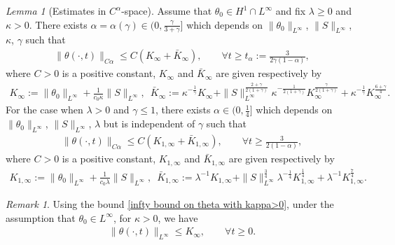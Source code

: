 \documentclass[reqno]{amsart}%
\theoremstyle{definition}
\theoremstyle{remark}
\numberwithin{equation}{section}
\newtheorem{lemma}[theorem]{Lemma}
\newtheorem{remark}[theorem]{Remark}
\newcommand{\bK}{\bar{K}_{\infty}}
\newcommand{\1}{\mathbf{1}}
\newcommand{\K}{K_{\infty}}
\numberwithin{equation}{section}
\numberwithin{theorem}{section}
\numberwithin{figure}{section}
\begin{document}
\begin{lemma}[Estimates in $C^\alpha$-space]\label{Estimates in C alpha-space lemma}
Assume that $\theta_0\in H^1\cap L^\infty$ and fix $\lambda\ge0$ and $\kappa>0$. There exists $\alpha=\alpha(\gamma)\in(0,\frac{\gamma}{3+\gamma}]$ which depends on $\|\theta_0\|_{L^\infty}$, $\|S\|_{L^\infty}$, $\kappa$, $\gamma$ such that
\begin{align}\label{bound on C alpha norm of theta with gamma}
\|\theta(\cdot,t)\|_{C\alpha}\le C(\K+\bK),\qquad\forall t\ge t_{\alpha}:=\frac{3}{2\gamma(1-\alpha)},
\end{align}
where $C>0$ is a positive constant, $\K$ and $\bK$ are given respectively by
{\footnotesize
\begin{align}\label{def of K and bar K}
\K:=\|\theta_0\|_{L^\infty}+\frac{1}{c_0\kappa}\|S\|_{L^\infty},\,\,\,\bK:=\kappa^{-\frac{1}{\gamma}}\K+\|S\|^\frac{2+\gamma}{2(1+\gamma)}_{L^\infty}\kappa^{-\frac{1}{2(1+\gamma)}}\K^{\frac{\gamma}{2(1+\gamma)}}+\kappa^{-\frac{1}{\gamma}}\K^{\frac{6+\gamma}{4}}.
\end{align}
}
For the case when $\lambda>0$ and $\gamma\le1$, there exists $\alpha\in(0,\frac{1}{4}]$ which depends on $\|\theta_0\|_{L^\infty}$, $\|S\|_{L^\infty}$, $\lambda$ but is independent of $\gamma$ such that 
\begin{align}\label{bound on C alpha norm of theta with gamma=1}
\|\theta(\cdot,t)\|_{C\alpha}\le C(K_{1,\infty}+\bar{K}_{1,\infty}),\qquad\forall t\ge \frac{3}{2(1-\alpha)},
\end{align}
where $C>0$ is a positive constant, $K_{1,\infty}$ and $\bar{K}_{1,\infty}$ are given respectively by
{\footnotesize
\begin{align}\label{def of K and bar K gamma=1}
K_{1,\infty}:=\|\theta_0\|_{L^\infty}+\frac{1}{c_0\lambda}\|S\|_{L^\infty},\,\,\,\bar{K}_{1,\infty}:=\lambda^{-1}K_{1,\infty}+\|S\|^\frac{3}{4}_{L^\infty}\lambda^{-\frac{1}{4}}K_{1,\infty}^{\frac{1}{4}}+\lambda^{-1}K_{1,\infty}^{\frac{7}{4}}.
\end{align}
}
\end{lemma}

\begin{remark}
Using the bound \eqref{infty bound on theta with kappa>0}, under the assumption that $\theta_0\in L^\infty$, for $\kappa>0$, we have
\begin{align}\label{infty bound on theta using K for kappa>0}
\|\theta(\cdot,t)\|_{L^\infty}\le \K,\qquad \forall t\ge0.
\end{align}
\end{remark}
\end{document}
